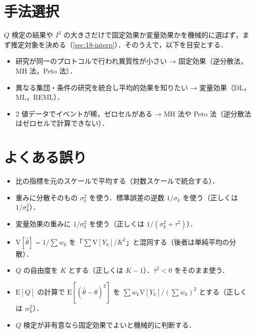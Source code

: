 \documentclass[a4paper,11pt,openany]{ltjsbook}
\newcommand{\tagbox}[2]{\tcbox[on line,boxsep=0.5pt,left=2pt,right=2pt,top=0.5pt,bottom=0.5pt,
  colframe=#1,colback=#1!10,boxrule=0.4pt,arc=1pt]{\scriptsize\bfseries\textcolor{#1}{#2}}}
\newcommand{\Youchui}{\tagbox{bkpurple}{要注意}}
\newcommand{\E}{\mathrm{E}}
\newcommand{\V}{\mathrm{V}}
\begin{document}
\section{手法選択}\label{sec:18-choice}
\Youchui $Q$ 検定の結果や $I^2$ の大きさだけで固定効果か変量効果かを機械的に選ばず，まず推定対象を決める（\cref{sec:18-interp}）．そのうえで，以下を目安とする．
\begin{itemize}
\item 研究が同一のプロトコルで行われ異質性が小さい → 固定効果（逆分散法，MH 法，Peto 法）．
\item 異なる集団・条件の研究を統合し平均的効果を知りたい → 変量効果（DL，ML，REML）．
\item 2 値データでイベントが稀，ゼロセルがある → MH 法や Peto 法（逆分散法はゼロセルで計算できない）．
\end{itemize}

\section{よくある誤り}\label{sec:18-err}
\begin{warnbox}
\begin{itemize}
\item 比の指標を元のスケールで平均する（対数スケールで統合する）．
\item 重みに分散そのもの $\sigma_k^2$ を使う．標準誤差の逆数 $1/\sigma_k$ を使う（正しくは $1/\sigma_k^2$）．
\item 変量効果の重みに $1/\sigma_k^2$ を使う（正しくは $1/(\sigma_k^2+\tau^2)$）．
\item $\V[\hat\theta]=1/\sum w_k$ を「$\sum\V[Y_k]/K^2$」と混同する（後者は単純平均の分散）．
\item $Q$ の自由度を $K$ とする（正しくは $K-1$）．$\hat\tau^2<0$ をそのまま使う．
\item $\E[Q]$ の計算で $\E[(\hat\theta-\theta)^2]$ を $\sum w_k\V[Y_k]/(\sum w_k)^2$ とする（正しくは $w_k^2$）．
\item $Q$ 検定が非有意なら固定効果でよいと機械的に判断する．
\end{itemize}
\end{warnbox}
\end{document}
